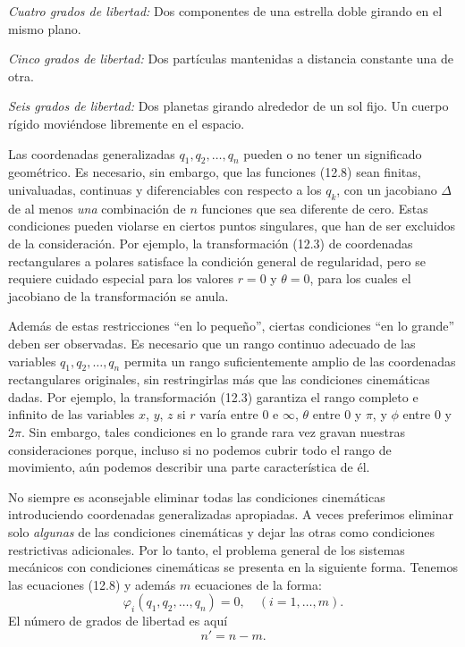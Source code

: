 \documentclass[12pt,a4paper]{book}
\begin{document}
\textit{Cuatro grados de libertad:} Dos componentes de una estrella doble girando en el mismo plano.

\textit{Cinco grados de libertad:} Dos part\'iculas mantenidas a distancia constante una de otra.

\textit{Seis grados de libertad:} Dos planetas girando alrededor de un sol fijo. Un cuerpo r\'igido movi\'endose libremente en el espacio.

\bigskip

Las coordenadas generalizadas $q_1, q_2, \ldots, q_n$ pueden o no tener un significado geom\'etrico. Es necesario, sin embargo, que las funciones (12.8) sean finitas, univaluadas, continuas y diferenciables con respecto a los $q_k$, con un jacobiano $\Delta$ de al menos \textit{una} combinaci\'on de $n$ funciones que sea diferente de cero. Estas condiciones pueden violarse en ciertos puntos singulares, que han de ser excluidos de la consideraci\'on. Por ejemplo, la transformaci\'on (12.3) de coordenadas rectangulares a polares satisface la condici\'on general de regularidad, pero se requiere cuidado especial para los valores $r = 0$ y $\theta = 0$, para los cuales el jacobiano de la transformaci\'on se anula.

Adem\'as de estas restricciones ``en lo peque\~no'', ciertas condiciones ``en lo grande'' deben ser observadas. Es necesario que un rango continuo adecuado de las variables $q_1, q_2, \ldots, q_n$ permita un rango suficientemente amplio de las coordenadas rectangulares originales, sin restringirlas m\'as que las condiciones cinem\'aticas dadas. Por ejemplo, la transformaci\'on (12.3) garantiza el rango completo e infinito de las variables $x$, $y$, $z$ si $r$ var\'ia entre $0$ e $\infty$, $\theta$ entre $0$ y $\pi$, y $\phi$ entre $0$ y $2\pi$. Sin embargo, tales condiciones en lo grande rara vez gravan nuestras consideraciones porque, incluso si no podemos cubrir todo el rango de movimiento, a\'un podemos describir una parte caracter\'istica de \'el.

No siempre es aconsejable eliminar todas las condiciones cinem\'aticas introduciendo coordenadas generalizadas apropiadas. A veces preferimos eliminar solo \textit{algunas} de las condiciones cinem\'aticas y dejar las otras como condiciones restrictivas adicionales. Por lo tanto, el problema general de los sistemas mec\'anicos con condiciones cinem\'aticas se presenta en la siguiente forma. Tenemos las ecuaciones (12.8) y adem\'as $m$ ecuaciones de la forma:
\begin{equation}
\varphi_i(q_1, q_2, \ldots, q_n) = 0, \quad (i = 1, \ldots, m).
\tag{12.9}
\end{equation}
El n\'umero de grados de libertad es aqu\'i
\[
n' = n - m.
\]
\end{document}
